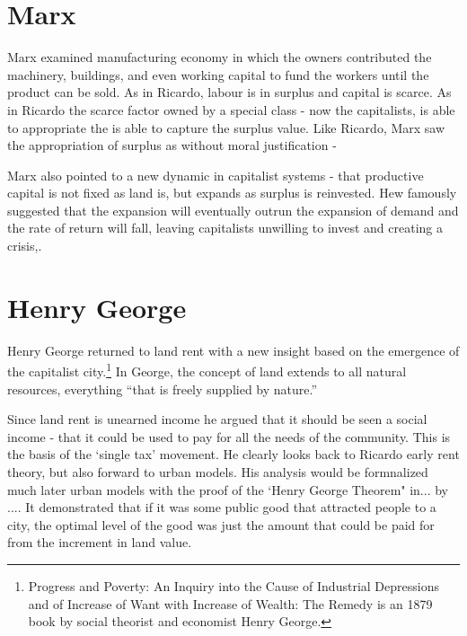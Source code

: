 \section{Marx}
 Marx examined  manufacturing economy in which the owners contributed the machinery, buildings, and even working capital to fund the workers until the product can be sold. %
As in Ricardo, labour is in surplus and capital is scarce. As in Ricardo the scarce factor owned by a special class - now the capitalists, is able to appropriate the is able to capture the surplus value. Like Ricardo,  Marx saw the appropriation of surplus as without moral justification - 

Marx also pointed to a new dynamic in capitalist systems - that productive capital is not fixed as land is, but  expands as surplus is reinvested. Hew famously suggested that the expansion will eventually outrun the expansion of demand and the rate of return will fall, leaving capitalists unwilling to invest and creating a crisis,.


 
\section{Henry George} 
  Henry George returned to land rent with a new insight based on the emergence of the capitalist city.\footnote{Progress and Poverty: An Inquiry into the Cause of Industrial Depressions and of Increase of Want with Increase of Wealth: The Remedy is an 1879 book by social theorist and economist Henry George.} In George, the concept of land extends to all natural resources, everything ``that is freely supplied by nature.''  
  
  Since land rent is unearned income he argued that it should be seen a social income - that it could be used to pay for all the needs of the community. This is the basis of the `single tax' movement. He clearly looks back to Ricardo early rent theory, but also forward to urban models. His analysis would be formnalized much later urban models with the proof of the `Henry George Theorem" in... by .... It demonstrated that if it was some public good that attracted people to a city, the optimal level of the good was just the amount that could be paid for from the increment in land value.
  
